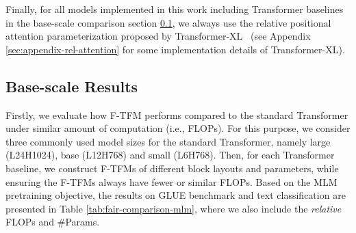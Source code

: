 \documentclass{article}
\theoremstyle{custom}
\begin{document}
Finally, for all models implemented in this work including Transformer baselines in the base-scale comparison section \ref{sec:exp-base-scale}, we always use the relative positional attention parameterization proposed by Transformer-XL~\cite{dai2019transformer} (see Appendix \ref{sec:appendix-rel-attention} for some implementation details of Transformer-XL).

\subsection{Base-scale Results}
\label{sec:exp-base-scale}
Firstly, we evaluate how F-TFM performs compared to the standard Transformer under similar amount of computation (i.e., FLOPs).
For this purpose, we consider three commonly used model sizes for the standard Transformer, namely large (L24H1024), base (L12H768) and small (L6H768).
Then, for each Transformer baseline, we construct F-TFMs of different block layouts and parameters, while ensuring the F-TFMs always have fewer or similar FLOPs.
Based on the MLM pretraining objective, the results on GLUE benchmark and text classification are presented in Table \ref{tab:fair-comparison-mlm}, where we also include the \textit{relative} FLOPs and \#Params.
\end{document}
